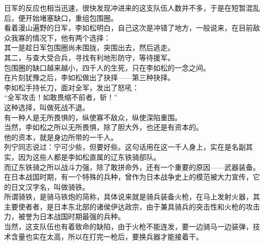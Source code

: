 \begin{multicols}{\theparacolNo}
日军的反应也相当迅速，很快发现冲进来的这支队伍人数并不多，于是在短暂混乱后，便开始堵塞缺口，重组包围圈。\\

看着漫山遍野的日军，李如松明白，自己这次是冲错了地方，一般说来，在目前敌众我寡的情况下，他有两个选择：\\

其一是趁日军包围圈尚未围拢，突围出去，然后逃走。\\

其二，与查大受合兵，寻找有利地形防守，等待援军。\\

包围圈的缺口越来越小，四千人的生死，只在李如松的一念之间。\\

在片刻犹豫之后，李如松做出了抉择——第三种抉择。\\

李如松手持长刀，面对全军，发出了怒吼：\\

“全军攻击！如敢畏缩不前者，斩！”\\

这种选择，叫做死战不退。\\

有一种人是无所畏惧的，纵使寡不敌众，纵使深陷重围。\\

当然，李如松之所以无所畏惧，除了胆大外，也还是有资本的。\\

他的资本，就是身边所带的一千人。\\

列宁同志说过：宁可少些，但要好些。这句话用在这一千人身上，实在是名副其实，因为这些人都是李如松直属的辽东铁骑部队。\\

而辽东铁骑之所以战斗力强，除了敢拼命外，还有一个重要的原因——武器装备。\\

在日本战国时期，有一个特殊的兵种，曾作为日本战争史上的模范被大力宣传，它的日文汉字名，叫做骑铁。\\

所谓骑铁，是骑马铁炮的简称，具体说来就是骑兵装备火枪，在马上发射火器，其主要使者者，是日本东北部的诸侯伊达政宗，由于兼具骑兵的突击性和火枪的攻击力，被誉为日本战国时期最强的兵种。\\

当然，这支队伍也有着致命的缺陷，由于火枪不能连发，要一边骑马一边装弹，技术含量也实在太高，所以在打完一枪后，要换兵器才能接着干。\\


\end{multicols}
